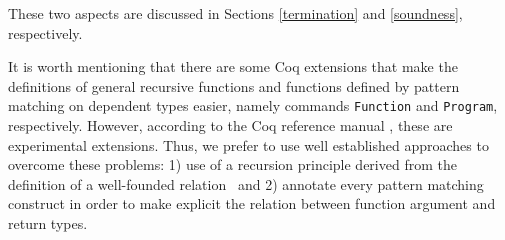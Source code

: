 These two aspects are discussed in Sections \ref{termination} and
\ref{soundness}, respectively.

It is worth mentioning that there are some Coq extensions that make
the definitions of general recursive functions and functions defined
by pattern matching on dependent types easier, namely commands
\texttt{Function} and \texttt{Program}, respectively. However,
according to the Coq reference manual \cite{coq}, these are
experimental extensions. Thus, we prefer to use well established
approaches to overcome these problems: 1) use of a recursion principle
derived from the definition of a well-founded
relation~ and 2) annotate every pattern matching
construct in order to make explicit the relation between function
argument and return types.
